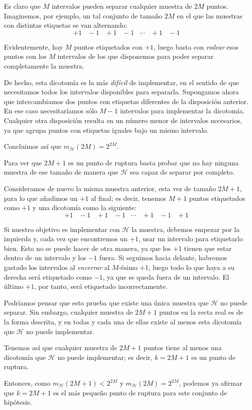 \documentclass[a4paper, 11pt]{article}
\begin{document}
    \begin{solucion}
        Es claro que $M$ intervalos pueden separar cualquier muestra de $2M$ puntos. Imaginemos, por ejemplo, un tal conjunto de tamaño $2M$ en el que las muestras con distintas etiquetas se van alternando:
        \[
        +1 \;\;\; -1  \;\;\; +1  \;\;\; -1  \;\;\; \cdots  \;\;\; +1  \;\;\; -1
        \]

        Evidentemente, hay $M$ puntos etiquetados con $+1$, luego basta con \emph{rodear} esos puntos con los $M$ intervalos de los que disponemos para poder separar completamente la muestra.

        De hecho, esta dicotomía es la más \emph{difícil} de implementar, en el sentido de que necesitamos todos los intervalos disponibles para separarla. Supongamos ahora que intercambiamos dos puntos con etiquetas diferentes de la disposición anterior. En ese caso necesitaríamos sólo $M - 1$ intervalos para implementar la dicotomía. Cualquier otra disposición resulta en un número menor de intervalos necesarios, ya que agrupa puntos con etiquetas iguales bajo un mismo intervalo.

        Concluimos así que $m_{\mathcal{H}}(2M) = 2^{2M}$.

        Para ver que $2M + 1$ es un punto de ruptura basta probar que no hay ninguna muestra de ese tamaño de manera que $\mathcal{H}$ sea capaz de separar por completo.

        Consideramos de nuevo la misma muestra anterior, esta vez de tamaño $2M + 1$, para lo que añadimos un $+1$ al final; es decir, tenemos $M + 1$ puntos etiquetados como $+1$ y una dicotomía como la siguiente:
        \[
        +1 \;\;\; -1  \;\;\; +1  \;\;\; -1  \;\;\; \cdots  \;\;\; +1  \;\;\; -1  \;\;\; +1
        \]

        Si nuestro objetivo es implementar con $\mathcal{H}$ la muestra, debemos empezar por la izquierda y, cada vez que encontremos un $+1$, usar un intervalo para etiquetarlo bien. Esto no se puede hacer de otra manera, ya que los $+1$ tienen que estar dentro de un intervalo y los $-1$ fuera. Si seguimos hacia delante, habremos gastado los intervalos al \emph{encerrar} al $M$-ésimo $+1$, luego todo lo que haya a su derecha será etiquetado como $-1$, ya que se queda fuera de un intervalo. El último $+1$, por tanto, será etiquetado incorrectamente.

        Podríamos pensar que esto prueba que existe una única muestra que $\mathcal{H}$ no puede separar. Sin embargo, cualquier muestra de $2M + 1$ puntos en la recta real es de la forma descrita, y en todas y cada una de ellas existe al menos esta dicotomía que $\mathcal{H}$ no puede implementar.

         Tenemos así que cualquier muestra de $2M + 1$ puntos tiene al menos una dicotomía que $\mathcal{H}$ no puede implementar; es decir, $k = 2M + 1$ es un punto de ruptura.

        Entonces, como $m_{\mathcal{H}}(2M + 1) < 2^{2M}$ y $m_{\mathcal{H}}(2M) = 2^{2M}$, podemos ya afirmar que $k = 2M + 1$ es el más pequeño punto de ruptura para este conjunto de hipótesis.
    \end{solucion}
\end{document}
